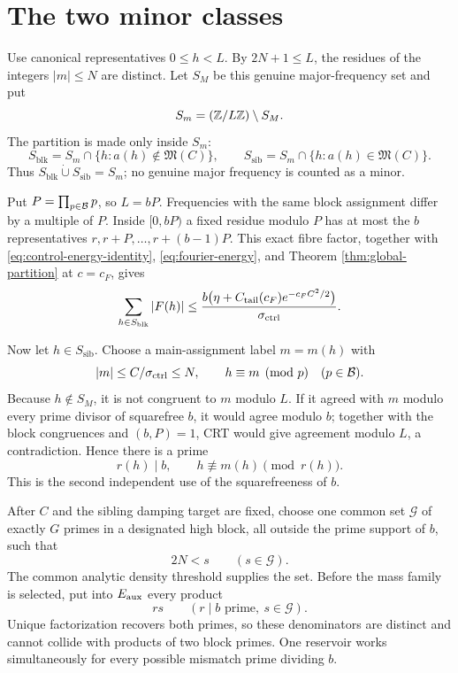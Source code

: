 \section{The two minor classes}\label{sec:minor}

Use canonical representatives $0\le h<L$.  By $2N+1\le L$, the residues of the
integers $|m|\le N$ are distinct.  Let $S_M$ be this genuine major-frequency
set and put
\[
 S_m=(\mathbb Z/L\mathbb Z)\setminus S_M.
\]
The partition is made only inside $S_m$:
\begin{equation}\label{eq:minor-partition}
 S_{\mathrm{blk}}
 =S_m\cap\{h:a(h)\notin\mathfrak M(C)\},
 \qquad
 S_{\mathrm{sib}}
 =S_m\cap\{h:a(h)\in\mathfrak M(C)\}.
\end{equation}
Thus $S_{\mathrm{blk}}\dot\cup S_{\mathrm{sib}}=S_m$; no genuine major
frequency is counted as a minor.

Put $P=\prod_{p\in\mathcal B}p$, so $L=bP$.  Frequencies with the same block
assignment differ by a multiple of $P$.  Inside $[0,bP)$ a fixed residue modulo
$P$ has at most the $b$ representatives
$r,r+P,\ldots,r+(b-1)P$.  This exact fibre factor, together with
\eqref{eq:control-energy-identity}, \eqref{eq:fourier-energy}, and Theorem
\ref{thm:global-partition} at $c=c_F$, gives
\begin{equation}\label{eq:block-minor-budget}
 \sum_{h\in S_{\mathrm{blk}}}|F(h)|
 \le
 \frac{b\bigl(\eta+C_{\mathrm{tail}}(c_F)e^{-c_FC^2/2}\bigr)}{\sigma_{\mathrm{ctrl}}}.
\end{equation}

Now let $h\in S_{\mathrm{sib}}$.  Choose a main-assignment label $m=m(h)$ with
\[
 |m|\le C/\sigma_{\mathrm{ctrl}}\le N,
 \qquad h\equiv m\pmod p\quad(p\in\mathcal B).
\]
Because $h\notin S_M$, it is not congruent to $m$ modulo $L$.  If it agreed
with $m$ modulo every prime divisor of squarefree $b$, it would agree modulo
$b$; together with the block congruences and $(b,P)=1$, CRT would give
agreement modulo $L$, a contradiction.  Hence there is a prime
\begin{equation}\label{eq:mismatch-prime}
 r(h)\mid b,
 \qquad h\not\equiv m(h)\pmod{r(h)}.
\end{equation}
This is the second independent use of the squarefreeness of $b$.

After $C$ and the sibling damping target are fixed, choose one common set
$\mathcal G$ of exactly $G$ primes in a designated high block, all outside the
prime support of $b$, such that
\begin{equation}\label{eq:high-prime-separation}
 2N<s\qquad(s\in\mathcal G).
\end{equation}
The common analytic density threshold supplies the set.  Before the mass family
is selected, put into $E_{\mathrm{aux}}$ every product
\begin{equation}\label{eq:aux-family}
 rs\qquad(r\mid b\text{ prime},\ s\in\mathcal G).
\end{equation}
Unique factorization recovers both primes, so these denominators are distinct
and cannot collide with products of two block primes.  One reservoir works
simultaneously for every possible mismatch prime dividing $b$.

